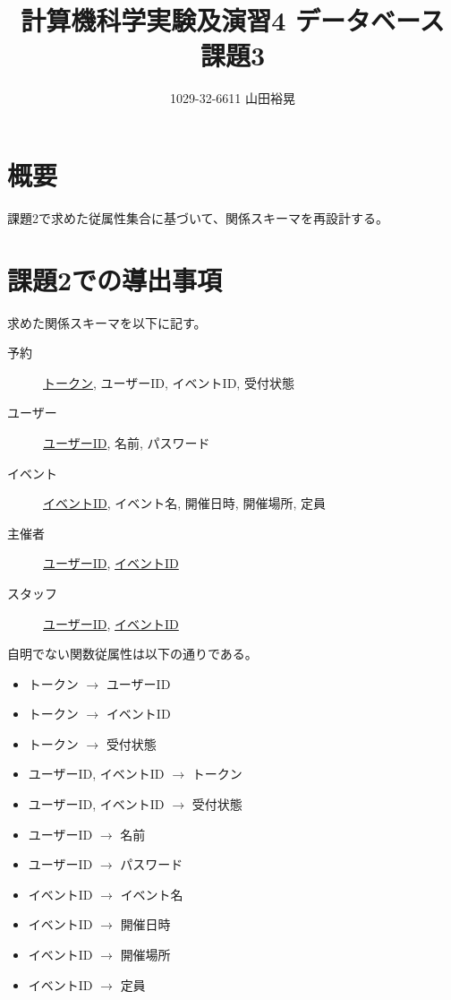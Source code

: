 \documentclass[dvipdfmx]{jarticle}
\begin{document}
\title{計算機科学実験及演習4 データベース 課題3}
\author{1029-32-6611 山田裕晃}
\maketitle

\section{概要}
課題2で求めた従属性集合に基づいて、関係スキーマを再設計する。

\section{課題2での導出事項}
求めた関係スキーマを以下に記す。

\begin{description}
  \item[予約] \underline{トークン}, ユーザーID, イベントID, 受付状態
  \item[ユーザー] \underline{ユーザーID}, 名前, パスワード
  \item[イベント] \underline{イベントID}, イベント名, 開催日時, 開催場所, 定員
  \item[主催者] \underline{ユーザーID}, \underline{イベントID}  
  \item[スタッフ] \underline{ユーザーID}, \underline{イベントID} 
\end{description}

自明でない関数従属性は以下の通りである。
\begin{itemize}
  \item {トークン} $\rightarrow$ {ユーザーID}
  \item {トークン} $\rightarrow$ {イベントID}
  \item {トークン} $\rightarrow$ {受付状態}
  \item {ユーザーID, イベントID} $\rightarrow$ {トークン}
  \item {ユーザーID, イベントID} $\rightarrow$ {受付状態}
  \item {ユーザーID} $\rightarrow$ {名前}
  \item {ユーザーID} $\rightarrow$ {パスワード}
  \item {イベントID} $\rightarrow$ {イベント名}
  \item {イベントID} $\rightarrow$ {開催日時}
  \item {イベントID} $\rightarrow$ {開催場所}
  \item {イベントID} $\rightarrow$ {定員}
\end{itemize}
\end{document}
